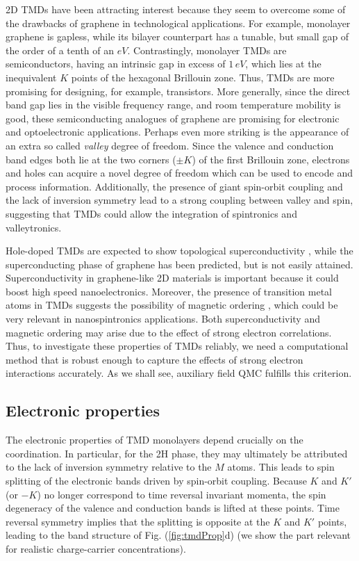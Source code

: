 \ac{2D} \acp{TMD} have been attracting interest because they seem to overcome some of the drawbacks of graphene in technological applications.
For example, monolayer graphene is gapless, while its bilayer counterpart has a tunable, but small gap of the order of a tenth of an $eV$.
Contrastingly, monolayer \acp{TMD} are semiconductors, having an intrinsic gap in excess of $1 \, eV$, which lies at the inequivalent $K$ points of the hexagonal Brillouin zone.
Thus, \acp{TMD} are more promising for designing, for example, transistors.
More generally, since the direct band gap lies in the visible frequency range, and room temperature mobility is good, these semiconducting analogues of graphene are promising for electronic and optoelectronic applications.
Perhaps even more striking is the appearance of an extra so called \emph{valley} degree of freedom.
Since the valence and conduction band edges both lie at the two corners ($\pm K$) of the first Brillouin zone, electrons and holes can acquire a novel degree of freedom which can be used to encode and process information.
Additionally, the presence of giant spin-orbit coupling and the lack of inversion symmetry lead to a strong coupling between valley and spin, suggesting that \acp{TMD} could allow the integration of spintronics and valleytronics.
 
Hole-doped \acp{TMD} are expected to show topological superconductivity \cite{hsu_topological_2017}, while the superconducting phase of graphene has been predicted, but is not easily attained.
Superconductivity in graphene-like \ac{2D} materials is important because it could boost high speed nanoelectronics.
Moreover, the presence of transition metal atoms in \acp{TMD} suggests the possibility of magnetic ordering \cite{braz_valley_2017}, which could be very relevant in nanospintronics applications.
Both superconductivity and magnetic ordering may arise due to the effect of strong electron correlations.
Thus, to investigate these properties of \acp{TMD} reliably, we need a computational method that is robust enough to capture the effects of strong electron interactions accurately.
As we shall see, auxiliary field \ac{QMC}  fulfills this criterion.

\subsection{Electronic properties}\label{subsec:electronic}

The electronic properties of \ac{TMD} monolayers depend crucially on the coordination.
In particular, for the 2H phase, they may ultimately be attributed to the lack of inversion symmetry relative to the $M$ atoms.
This leads to spin splitting of the electronic bands driven by spin-orbit coupling.
Because $K$ and $K'$ (or $-K$) no longer correspond to time reversal invariant momenta, the spin degeneracy of the valence and conduction bands is lifted at these points.
Time reversal symmetry implies that the splitting is opposite at the $K$ and $K'$ points, leading to the band structure of Fig. (\ref{fig:tmdProp}d) (we show the part relevant for realistic charge-carrier concentrations).

